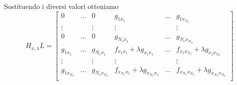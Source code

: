 Sostituendo i diversi valori otteniamo
$$
H_{x,\lambda}L=\left [
\begin{array}{cccccc}
0&\dots&0&g_{1x_1}&\dots&g_{1x_{N_x}}\\
\vdots&&\vdots&\vdots&&\vdots\\
0&\dots&0&g_{{N_e}x_1}&\dots&g_{{N_e}x_{N_x}}\\
g_{1x_1}&\dots&g_{{N_e}x_1}&f_{x_1x_1}+\lambda g_{x_1x_1}&\dots&f_{x_1x_{N_x}}+\lambda g_{x_1x_{N_x}}\\
\vdots&&\vdots&\vdots&&\vdots\\
g_{1x_{N_x}}&\dots&g_{{N_e}x_{N_x}}&f_{x_{N_x}x_1}+\lambda g_{x_{N_x}x_1}&\dots&f_{x_{N_x}x_{N_x}}+\lambda g_{x_{N_x}x_{N_x}}\\
\end{array}
\right ]
$$
